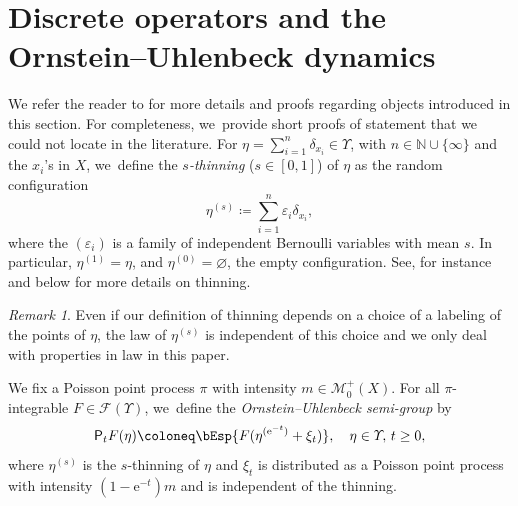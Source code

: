 \documentclass[JEP,XML,SOM,Unicode,published]{cedram}
\theoremstyle{definition}
\theoremstyle{remark}
\newtheorem{remark}[theorem]{Remark}
\begin{document}
\section{Discrete operators and the Ornstein--Uhlenbeck dynamics}\label{s:ou}
\label{s:mehler}
We refer the reader to \cite{LastAnaSto} for more details and proofs regarding objects introduced in this section.
For completeness, we~provide short proofs of statement that we could not locate in the literature.
For $\eta = \sum_{i=1}^{n} \delta_{x_{i}} \in \varUpsilon$, with $n \in \mathbb{N} \cup \{ \infty\}$ and the $x_{i}$'s in $X$, we~define the \emph{$s$-thinning} ($s \in [0,1]$) of $\eta$ as the random configuration
\begin{equation*}
\eta^{(s)} \coloneq \sum_{i=1}^{n} \varepsilon_{i} \delta_{x_{i}},
\end{equation*}
where the $(\varepsilon_{i})$ is a family of independent Bernoulli variables with mean $s$.
In particular, $\eta^{(1)} = \eta$, and $\eta^{(0)} = \varnothing$, the empty configuration.
See, for instance~\cite[Def.\,5.7]{LastPenrose} and below for more details on thinning.
\begin{remark}
Even if our definition of thinning depends on a choice of a labeling of the points of $\eta$, the law of $\eta^{(s)}$ is independent of this choice and we only deal with properties in law in this paper.
\end{remark}

We fix a Poisson point process $\pi$ with intensity $m \in \mathscr{M}_{0}^{+}(X)$.
For all $\pi$-integrable $F \in \mathscr{F}(\varUpsilon)$, we~define the \emph{Ornstein--Uhlenbeck semi-group} by
\begin{equation*}
\mathsf{P}_{t} F(\eta) \coloneq \bEsp{ F(\eta^{(\mathrm{e}^{-t})} + \xi_{t}) }, \quad \eta \in \varUpsilon,\, t \ge 0,
\end{equation*}
where $\eta^{(s)}$ is the $s$-thinning of $\eta$ and $\xi_{t}$ is distributed as a Poisson point process with intensity $(1-\mathrm{e}^{-t})m$ and is independent of the thinning.
\end{document}
